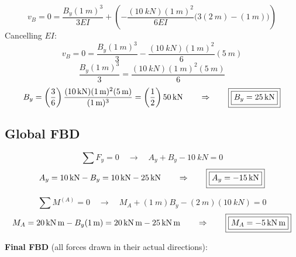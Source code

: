 \documentclass[11pt]{article}
\begin{document}
\[
  v_B = 0 = \frac{B_y(\SI{1}{m})^3}{3EI}
  + \left(-\frac{(\SI{10}{kN})(\SI{1}{m})^2}{6EI}\bigl(3(\SI{2}{m}) - (\SI{1}{m})\bigr)\right)
\]
Cancelling $EI$:
\[
  v_B = 0 = \frac{B_y(\SI{1}{m})^3}{3} - \frac{(\SI{10}{kN})(\SI{1}{m})^2}{6}(\SI{5}{m})
\]
\[
  \frac{B_y(\SI{1}{m})^3}{3} = \frac{(\SI{10}{kN})(\SI{1}{m})^2(\SI{5}{m})}{6}
\]
\[
  B_y = \left(\frac{3}{6}\right)\frac{(\SI{10}{kN})(\SI{1}{m})^2(\SI{5}{m})}{(\SI{1}{m})^3}
      = \left(\frac12\right)\SI{50}{kN}
  \qquad\Rightarrow\qquad
  \fbox{\fbox{$B_y = \SI{25}{kN}$}}
\]

\subsection*{Global FBD}

\[
  \textstyle\sum F_y = 0 \quad\rightarrow\quad A_y + B_y - \SI{10}{kN} = 0
\]
\[
  A_y = \SI{10}{kN} - B_y = \SI{10}{kN} - \SI{25}{kN}
  \qquad\Rightarrow\qquad
  \fbox{\fbox{$A_y = -\SI{15}{kN}$}}
\]

\[
  \textstyle\sum M^{(A)} = 0 \quad\rightarrow\quad
  M_A + (\SI{1}{m})B_y - (\SI{2}{m})(\SI{10}{kN}) = 0
\]
\[
  M_A = \SI{20}{kN.m} - B_y(\SI{1}{m}) = \SI{20}{kN.m} - \SI{25}{kN.m}
  \qquad\Rightarrow\qquad
  \fbox{\fbox{$M_A = -\SI{5}{kN.m}$}}
\]

\noindent
\textbf{Final FBD} (all forces drawn in their actual directions):

\begin{center}
\end{center}
\end{document}
